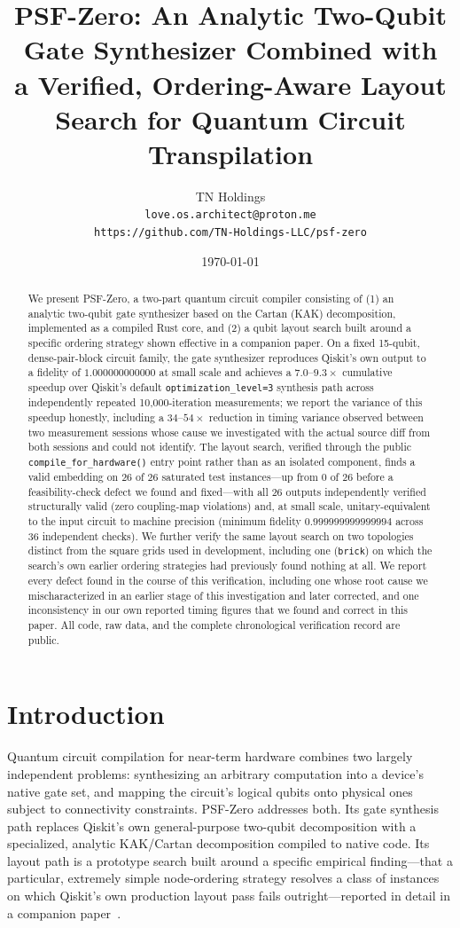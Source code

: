 \documentclass[11pt]{article}
\title{PSF-Zero: An Analytic Two-Qubit Gate Synthesizer Combined with\\
a Verified, Ordering-Aware Layout Search for Quantum Circuit\\
Transpilation}
\author{TN Holdings\\
\texttt{love.os.architect@proton.me}\\
\texttt{https://github.com/TN-Holdings-LLC/psf-zero}}
\date{\today}
\begin{document}
\maketitle

\begin{abstract}
We present PSF-Zero, a two-part quantum circuit compiler consisting of
(1) an analytic two-qubit gate synthesizer based on the Cartan (KAK)
decomposition, implemented as a compiled Rust core, and (2) a qubit
layout search built around a specific ordering strategy shown effective
in a companion paper. On a fixed 15-qubit, dense-pair-block circuit
family, the gate synthesizer reproduces Qiskit's own output to a
fidelity of $1.000000000000$ at small scale and achieves a
$7.0$--$9.3\times$ cumulative speedup over Qiskit's default
\texttt{optimization\_level=3} synthesis path across independently
repeated 10,000-iteration measurements; we report the variance of this
speedup honestly, including a $34$--$54\times$ reduction in timing
variance observed between two measurement sessions whose cause we
investigated with the actual source diff from both sessions and could
not identify. The layout search, verified through the public
\texttt{compile\_for\_hardware()} entry point rather than as an isolated
component, finds a valid embedding on 26 of 26 saturated test
instances---up from 0 of 26 before a feasibility-check defect we found
and fixed---with all 26 outputs independently verified structurally
valid (zero coupling-map violations) and, at small scale,
unitary-equivalent to the input circuit to machine precision (minimum
fidelity $0.999999999999994$ across 36 independent checks). We further
verify the same layout search on two topologies distinct from the
square grids used in development, including one (\texttt{brick}) on
which the search's own earlier ordering strategies had previously found
nothing at all. We report every defect found in the course of this
verification, including one whose root cause we mischaracterized in an
earlier stage of this investigation and later corrected, and one
inconsistency in our own reported timing figures that we found and
correct in this paper. All code, raw data, and the complete
chronological verification record are public.
\end{abstract}

\section{Introduction}

Quantum circuit compilation for near-term hardware combines two largely
independent problems: synthesizing an arbitrary computation into a
device's native gate set, and mapping the circuit's logical qubits onto
physical ones subject to connectivity constraints. PSF-Zero addresses
both. Its gate synthesis path replaces Qiskit's own general-purpose
two-qubit decomposition with a specialized, analytic KAK/Cartan
decomposition compiled to native code. Its layout path is a prototype
search built around a specific empirical finding---that a particular,
extremely simple node-ordering strategy resolves a class of instances
on which Qiskit's own production layout pass fails outright---reported
in detail in a companion paper~\cite{vf2cliff}.
\end{document}
